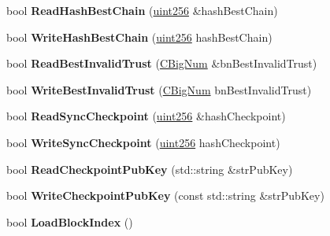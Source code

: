 \begin{DoxyCompactItemize}
\mbox{\label{class_c_tx_d_b_a9aae38d6e39ce57a1b8eaaeaea81e4de}} 
bool {\bfseries Read\+Hash\+Best\+Chain} (\mbox{\hyperlink{classuint256}{uint256}} \&hash\+Best\+Chain)
\item 
\mbox{\label{class_c_tx_d_b_a2cf58de69c1c07e500a1f8d0b0709476}} 
bool {\bfseries Write\+Hash\+Best\+Chain} (\mbox{\hyperlink{classuint256}{uint256}} hash\+Best\+Chain)
\item 
\mbox{\label{class_c_tx_d_b_ab0e2e8f95c4f891c0a9245d5ba6b0b68}} 
bool {\bfseries Read\+Best\+Invalid\+Trust} (\mbox{\hyperlink{class_c_big_num}{C\+Big\+Num}} \&bn\+Best\+Invalid\+Trust)
\item 
\mbox{\label{class_c_tx_d_b_ad9593efae66f6a73fafba93ad05fd2b8}} 
bool {\bfseries Write\+Best\+Invalid\+Trust} (\mbox{\hyperlink{class_c_big_num}{C\+Big\+Num}} bn\+Best\+Invalid\+Trust)
\item 
\mbox{\label{class_c_tx_d_b_a85576980e059ee1471fe6ae2ae8f1b59}} 
bool {\bfseries Read\+Sync\+Checkpoint} (\mbox{\hyperlink{classuint256}{uint256}} \&hash\+Checkpoint)
\item 
\mbox{\label{class_c_tx_d_b_a6fed172063f2ec1f4688ac3f21b0608a}} 
bool {\bfseries Write\+Sync\+Checkpoint} (\mbox{\hyperlink{classuint256}{uint256}} hash\+Checkpoint)
\item 
\mbox{\label{class_c_tx_d_b_ab05fe91e649658eebe0a05227fde3059}} 
bool {\bfseries Read\+Checkpoint\+Pub\+Key} (std\+::string \&str\+Pub\+Key)
\item 
\mbox{\label{class_c_tx_d_b_ab417d5e3a281ae192658dcac6f4a39a9}} 
bool {\bfseries Write\+Checkpoint\+Pub\+Key} (const std\+::string \&str\+Pub\+Key)
\item 
\mbox{\label{class_c_tx_d_b_abcb9df0821d996f811f6604b452a26a0}} 
bool {\bfseries Load\+Block\+Index} ()
\end{DoxyCompactItemize}

